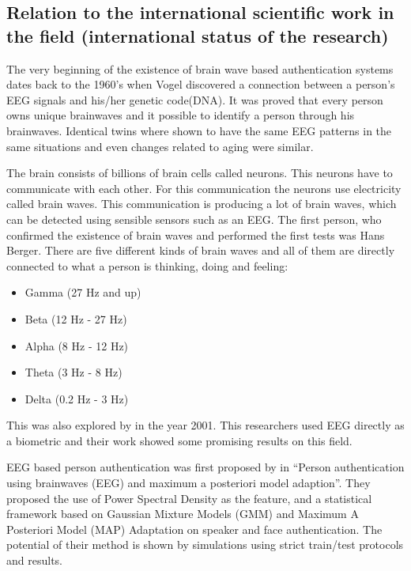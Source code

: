 \subsection{Relation to the international scientific work in the field (international status of the research)}
The very beginning of the existence of brain wave based authentication systems dates back to the 1960's when Vogel discovered a connection between a person's EEG signals and his/her genetic code(DNA). It was proved that every person owns unique brainwaves and it possible to identify a person through his brainwaves. Identical twins where shown to have the same EEG patterns in the same situations and even changes related to aging were similar. 

The brain consists of billions of brain cells called neurons. This neurons have to communicate with each other. For this communication the neurons use electricity called brain waves. This communication is producing a lot of brain waves, which can be detected using sensible sensors such as an EEG. The first person, who confirmed the existence of brain waves and performed the first tests was Hans Berger. There are five different kinds of brain waves and all of them are directly connected to what a person is thinking, doing and feeling:

\begin{itemize}
 \item Gamma (27 Hz and up)
 \item Beta (12 Hz - 27 Hz)
 \item Alpha (8 Hz - 12 Hz)
 \item Theta (3 Hz - 8 Hz)
 \item Delta (0.2 Hz - 3 Hz)
\end{itemize}



This was also explored by \cite{Benedicenti2001} in the year 2001. This researchers used EEG directly as a biometric and their work showed some promising results on this field.


EEG based person authentication was first proposed by \cite{marcel} in “Person authentication using brainwaves (EEG) and maximum a posteriori model adaption”. They proposed the use of  Power Spectral Density as the feature, and a statistical framework based on Gaussian Mixture  Models (GMM) and Maximum A Posteriori Model (MAP) Adaptation on speaker and face  authentication. The potential of their method is shown by simulations using strict train/test protocols and results. 

